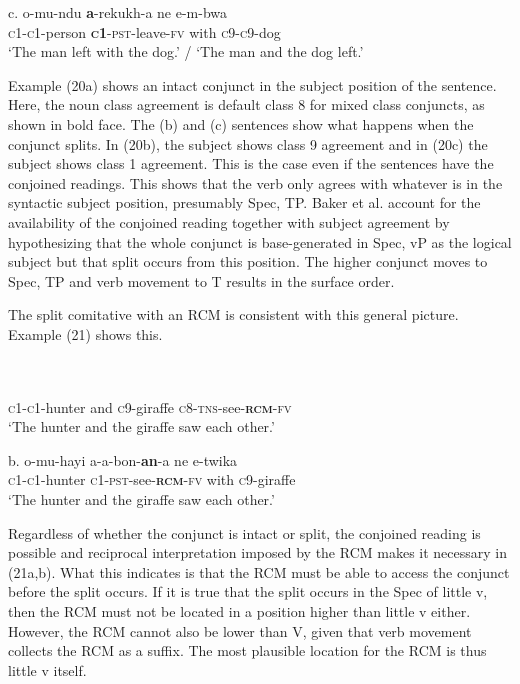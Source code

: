 \documentclass[output=paper]{langsci/langscibook}
\begin{document}
\gll \textup{c.}  o-mu-ndu   \textbf{a}-rekukh-a     ne   e-m-bwa\\
       \textsc{c1-c1}-person   \textbf{\textsc{c}}\textbf{1}-\textsc{pst}-leave-\textsc{fv}   with   \textsc{c9-c9}-dog\\
\glt   ‘The man left with the dog.’ / ‘The man and the dog left.’
\z

Example (20a) shows an intact conjunct in the subject position of the sentence. Here, the noun class agreement is default class 8 for mixed class conjuncts, as shown in bold face. The (b) and (c) sentences show what happens when the conjunct splits. In (20b), the subject shows class 9 agreement and in (20c) the subject shows class 1 agreement. This is the case even if the sentences have the conjoined readings. This shows that the verb only agrees with whatever is in the syntactic subject position, presumably Spec, TP. Baker et al. account for the availability of the conjoined reading together with subject agreement by hypothesizing that the whole conjunct is base-generated in Spec, vP as the logical subject but that split occurs from this position. The higher conjunct moves to Spec, TP and verb movement to T results in the surface order.  

  The split comitative with an RCM is consistent with this general picture. Example (21) shows this.


\ea\label{ex:}
  \\
\ea\label{ex:}
  \\

       \textsc{c1-c1}-hunter   and   \textsc{c}9-giraffe   \textsc{c8-tns}-see-\textbf{\textsc{rcm}}\textsc{-fv} \\
\glt   ‘The hunter and the giraffe saw each other.’
\z

\gll \textup{b.}  o-mu-hayi     a-a-bon-\textbf{an}-a     ne   e-twika\\
       \textsc{c1-c1}-hunter    \textsc{c1-pst}-see-\textbf{\textsc{rcm}}\textsc{-fv}  with  \textsc{c}9-giraffe   \\
\glt   ‘The hunter and the giraffe saw each other.’
\z

Regardless of whether the conjunct is intact or split, the conjoined reading is possible and reciprocal interpretation imposed by the RCM makes it necessary in (21a,b). What this indicates is that the RCM must be able to access the conjunct before the split occurs. If it is true that the split occurs in the Spec of little v, then the RCM must not be located in a position higher than little v either. However, the RCM cannot also be lower than V, given that verb movement collects the RCM as a suffix. The most plausible location for the RCM is thus little v itself. 
\end{document}
